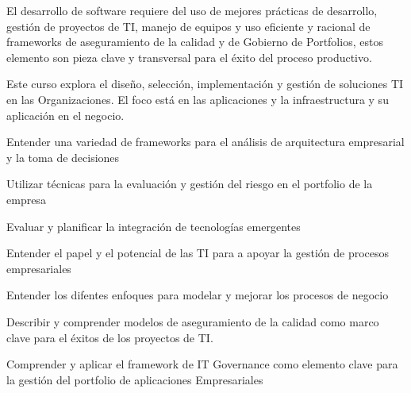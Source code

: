 \begin{syllabus}


\begin{justification}
El desarrollo de software requiere del uso de mejores prácticas de desarrollo, gestión de proyectos de TI, manejo de equipos
y uso eficiente y racional de frameworks de aseguramiento de la calidad y de Gobierno de Portfolios, estos elemento son pieza 
clave y transversal para el éxito del proceso productivo.

Este curso explora el diseño, selección, implementación y gestión de soluciones TI en las Organizaciones. El foco está en 
las aplicaciones y la infraestructura y su aplicación en el negocio.
\end{justification}

\begin{goals}
\item Entender una variedad de frameworks para el análisis de arquitectura empresarial y la toma de decisiones
\item Utilizar técnicas para la evaluación y gestión del riesgo en el portfolio de la empresa
\item Evaluar y planificar la integración de tecnologías emergentes
\item Entender el papel y el potencial de las TI para a apoyar la gestión de procesos empresariales
\item Entender los difentes enfoques para modelar y mejorar los procesos de negocio
\item Describir y comprender modelos de aseguramiento de la calidad como marco clave para el éxitos de los proyectos de TI.
\item Comprender y aplicar el framework de IT Governance como elemento clave para la gestión del portfolio de aplicaciones Empresariales
\end{goals}

\begin{outcomes}
    \item {}
    \item {}
    \item {}
    \item {}
    \item {}
    \item {}
\end{outcomes}


\end{syllabus}

